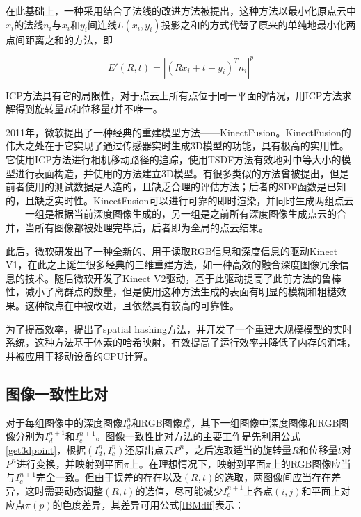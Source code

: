 \documentclass{llncs}
\begin{document}
\begin{CJK}{UTF8}{song}
在此基础上，一种采用结合了法线的改进方法被提出\cite{Chen1992Object}，这种方法以最小化原点云中$x_i$的法线$n_i$与$x_i$和$y_i$间连线$L(x_i,y_i)$投影之和的方式代替了原来的单纯地最小化两点间距离之和的方法，即

\begin{equation}
E'(R,t) = |(Rx_i+t-y_i)^Tn_i|^p
\end{equation}

ICP方法具有它的局限性，对于点云上所有点位于同一平面的情况，用ICP方法求解得到旋转量$R$和位移量$t$并不唯一。

2011年，微软提出了一种经典的重建模型方法——KinectFusion。KinectFusion\cite{DBLP:conf/ismar/NewcombeIHMKDKSHF11}的伟大之处在于它实现了通过传感器实时生成3D模型的功能，具有极高的实用性。它使用ICP方法进行相机移动路径的追踪，使用TSDF方法有效地对中等大小的模型进行表面构造，并使用\cite{DBLP:conf/siggraph/CurlessL96}的方法建立3D模型。有很多类似的方法曾被提出\cite{DBLP:conf/cimaging/KubackiBBD12,DBLP:conf/eccv/RenR12}，但是前者使用的测试数据是人造的，且缺乏合理的评估方法；后者的SDF函数是已知的，且缺乏实时性。KinectFusion可以进行可靠的即时渲染，并同时生成两组点云——一组是根据当前深度图像生成的，另一组是之前所有深度图像生成点云的合并，当所有图像都被处理完毕后，后者即为全局的点云结果。

此后，微软研发出了一种全新的、用于读取RGB信息和深度信息的驱动Kinect V1，在此之上诞生很多经典的三维重建方法，如一种高效的融合深度图像冗余信息的技术\cite{DBLP:conf/scia/KyostilaCKH13}。随后微软开发了Kinect V2驱动，\cite{DBLP:conf/scia/YlimakiKH17}基于此驱动提高了此前方法的鲁棒性，减小了离群点的数量，但是使用这种方法生成的表面有明显的模糊和粗糙效果。这种缺点在\cite{DBLP:journals/corr/abs-1804-08912}中被改进，且依然具有较高的可靠性。

为了提高效率，\cite{DBLP:journals/tog/NiessnerZIS13}提出了spatial hashing方法，并开发了一个重建大规模模型的实时系统，这种方法基于体素的哈希映射，有效提高了运行效率并降低了内存的消耗，并被应用于移动设备的CPU计算\cite{DBLP:conf/rss/KlingensmithDSX15}。




	\subsection{图像一致性比对}

对于每组图像中的深度图像$I^n_d$和RGB图像$I^n_c$，其下一组图像中深度图像和RGB图像分别为$I^{n+1}_d$和$I^{n+1}_c$。图像一致性比对方法的主要工作是先利用公式\ref{get3dpoint}，根据$(I^n_d,I^n_c)$还原出点云$P^n$，之后选取适当的旋转量$R$和位移量$t$对$P^n$进行变换，并映射到平面$\pi$上\cite{DBLP:conf/iccvw/SteinbruckerSC11}。在理想情况下，映射到平面$\pi$上的RGB图像应当与$I^{n+1}_c$完全一致。但由于误差的存在以及$(R,t)$的选取，两图像间应当存在差异，这时需要动态调整$(R,t)$的选值，尽可能减少$I^{n+1}_c$上各点$(i,j)$和平面上对应点$\pi(p)$的色度差异，其差异可用公式\ref{IBMdif}表示：


\end{CJK}
\end{document}
